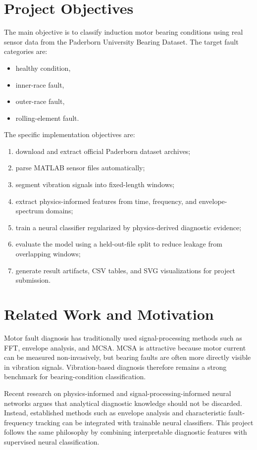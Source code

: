 \documentclass[11pt,a4paper]{article}
\begin{document}
\section{Project Objectives}
The main objective is to classify induction motor bearing conditions using real sensor data from the Paderborn University Bearing Dataset. The target fault categories are:

\begin{itemize}[leftmargin=2em]
    \item healthy condition,
    \item inner-race fault,
    \item outer-race fault,
    \item rolling-element fault.
\end{itemize}

The specific implementation objectives are:
\begin{enumerate}[leftmargin=2em]
    \item download and extract official Paderborn dataset archives;
    \item parse MATLAB sensor files automatically;
    \item segment vibration signals into fixed-length windows;
    \item extract physics-informed features from time, frequency, and envelope-spectrum domains;
    \item train a neural classifier regularized by physics-derived diagnostic evidence;
    \item evaluate the model using a held-out-file split to reduce leakage from overlapping windows;
    \item generate result artifacts, CSV tables, and SVG visualizations for project submission.
\end{enumerate}

\section{Related Work and Motivation}
Motor fault diagnosis has traditionally used signal-processing methods such as FFT, envelope analysis, and MCSA. MCSA is attractive because motor current can be measured non-invasively, but bearing faults are often more directly visible in vibration signals. Vibration-based diagnosis therefore remains a strong benchmark for bearing-condition classification.

Recent research on physics-informed and signal-processing-informed neural networks argues that analytical diagnostic knowledge should not be discarded. Instead, established methods such as envelope analysis and characteristic fault-frequency tracking can be integrated with trainable neural classifiers. This project follows the same philosophy by combining interpretable diagnostic features with supervised neural classification.
\end{document}
